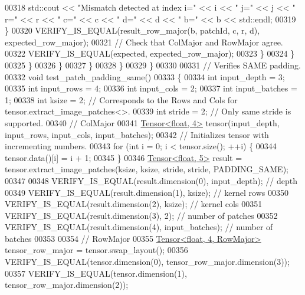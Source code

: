 \begin{DoxyCode}
00318                 std::cout << \textcolor{stringliteral}{"Mismatch detected at index i="} << i << \textcolor{stringliteral}{" j="} << j << \textcolor{stringliteral}{" r="} << r << \textcolor{stringliteral}{" c="} << c
       << \textcolor{stringliteral}{" d="} << d << \textcolor{stringliteral}{" b="} << b << std::endl;
00319               \}
00320               VERIFY\_IS\_EQUAL(result\_row\_major(b, patchId, c, r, d), expected\_row\_major);
00321               \textcolor{comment}{// Check that ColMajor and RowMajor agree.}
00322               VERIFY\_IS\_EQUAL(expected, expected\_row\_major);
00323             \}
00324           \}
00325         \}
00326       \}
00327     \}
00328   \}
00329 \}
00330 
00331 \textcolor{comment}{// Verifies SAME padding.}
00332 \textcolor{keywordtype}{void} test\_patch\_padding\_same()
00333 \{
00334   \textcolor{keywordtype}{int} input\_depth = 3;
00335   \textcolor{keywordtype}{int} input\_rows = 4;
00336   \textcolor{keywordtype}{int} input\_cols = 2;
00337   \textcolor{keywordtype}{int} input\_batches = 1;
00338   \textcolor{keywordtype}{int} ksize = 2;  \textcolor{comment}{// Corresponds to the Rows and Cols for tensor.extract\_image\_patches<>.}
00339   \textcolor{keywordtype}{int} stride = 2;  \textcolor{comment}{// Only same stride is supported.}
00340   \textcolor{comment}{// ColMajor}
00341   \hyperlink{class_eigen_1_1_tensor}{Tensor<float, 4>} tensor(input\_depth, input\_rows, input\_cols, input\_batches);
00342   \textcolor{comment}{// Initializes tensor with incrementing numbers.}
00343   \textcolor{keywordflow}{for} (\textcolor{keywordtype}{int} i = 0; i < tensor.size(); ++i) \{
00344     tensor.data()[i] = i + 1;
00345   \}
00346   \hyperlink{class_eigen_1_1_tensor}{Tensor<float, 5>} result = tensor.extract\_image\_patches(ksize, ksize, stride, stride, 
      PADDING\_SAME);
00347 
00348   VERIFY\_IS\_EQUAL(result.dimension(0), input\_depth);  \textcolor{comment}{// depth}
00349   VERIFY\_IS\_EQUAL(result.dimension(1), ksize);  \textcolor{comment}{// kernel rows}
00350   VERIFY\_IS\_EQUAL(result.dimension(2), ksize);  \textcolor{comment}{// kernel cols}
00351   VERIFY\_IS\_EQUAL(result.dimension(3), 2);  \textcolor{comment}{// number of patches}
00352   VERIFY\_IS\_EQUAL(result.dimension(4), input\_batches);  \textcolor{comment}{// number of batches}
00353 
00354   \textcolor{comment}{// RowMajor}
00355   \hyperlink{class_eigen_1_1_tensor}{Tensor<float, 4, RowMajor>} tensor\_row\_major = tensor.swap\_layout();
00356   VERIFY\_IS\_EQUAL(tensor.dimension(0), tensor\_row\_major.dimension(3));
00357   VERIFY\_IS\_EQUAL(tensor.dimension(1), tensor\_row\_major.dimension(2));

\end{DoxyCode}
